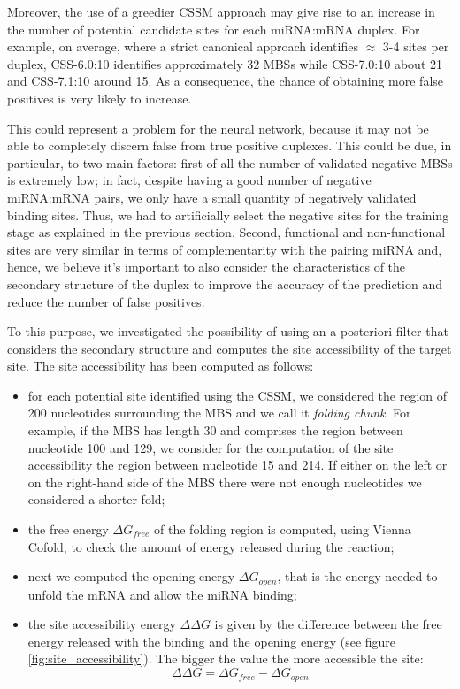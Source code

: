Moreover, the use of a greedier CSSM approach may give rise to an increase in the number of potential candidate sites for each miRNA:mRNA duplex. For example, on average, where a strict canonical approach identifies $\approx$ 3-4 sites per duplex, CSS-6.0:10 identifies approximately 32 MBSs while CSS-7.0:10 about 21 and CSS-7.1:10 around 15. As a consequence, the chance of obtaining more false positives is very likely to increase.  

This could represent a problem for the neural network, because it may not be able to completely discern false from true positive duplexes. This could be due, in particular, to two main factors: first of all the number of validated negative MBSs is extremely low; in fact, despite having a good number of negative miRNA:mRNA pairs, we only have a small quantity of negatively validated binding sites. Thus, we had to artificially select the negative sites for the training stage as explained in the previous section. Second, functional and non-functional sites are very similar in terms of complementarity with the pairing miRNA and, hence, we believe it's important to also consider the characteristics of the secondary structure of the duplex to improve the accuracy of the prediction and reduce the number of false positives. 

To this purpose, we investigated the possibility of using an a-posteriori filter that considers the secondary structure and computes the site accessibility of the target site. The site accessibility has been computed as follows:
\begin{itemize}
	\item for each potential site identified using the CSSM, we considered the region of 200 nucleotides surrounding the MBS and we call it \emph{folding chunk}. For example, if the MBS has length 30 and comprises the region between nucleotide 100 and 129, we consider for the computation of the site accessibility the region between nucleotide 15 and 214. If either on the left or on the right-hand side of the MBS there were not enough nucleotides we considered a shorter fold;
	\item the free energy $\Delta G_{free}$ of the folding region is computed, using Vienna Cofold, to check the amount of energy released during the reaction;
	\item next we computed the opening energy $\Delta G_{open}$, that is the energy needed to unfold the mRNA and allow the miRNA binding;
	\item the site accessibility energy $\Delta\Delta G$ is given by the difference between the free energy released with the binding and the opening energy (see figure \ref{fig:site_accessibility}). The bigger the value the more accessible the site:
	\begin{equation} \label{eq:sa}
		\Delta\Delta G = \Delta G_{free} - \Delta G_{open}
	\end{equation}
	 
\end{itemize}    

